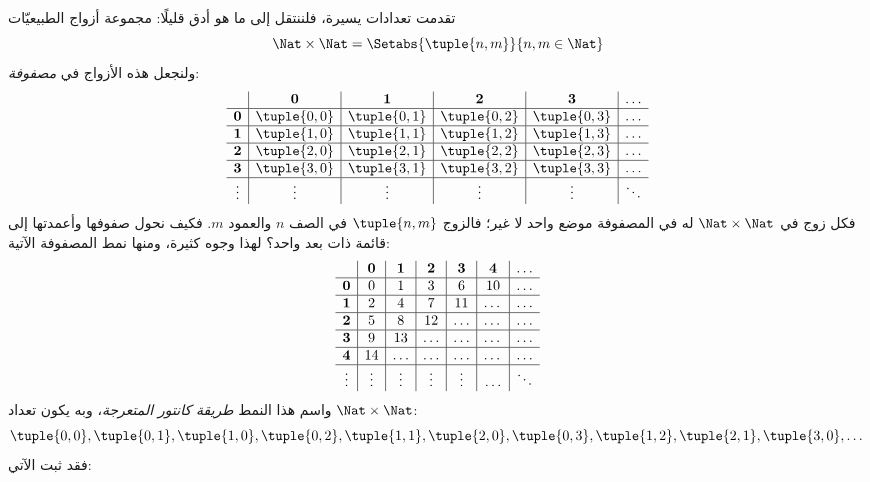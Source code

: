 \documentclass[../../../include/open-logic-section]{subfiles}
\begin{document}


\begin{explain}
تقدمت تعدادات يسيرة، فلننتقل إلى ما هو أدق قليلًا: مجموعة أزواج
الطبيعيّات
\[
\Nat \times \Nat = \Setabs{\tuple{n,m}}{n,m \in \Nat}
\]
ولنجعل هذه الأزواج في \emph{مصفوفة}:
\[
\begin{array}{ c | c | c | c | c | c}
& \mathbf 0 & \mathbf 1 & \mathbf 2 & \mathbf 3 & \dots \\
\hline
\mathbf 0 & \tuple{0,0} & \tuple{0,1} & \tuple{0,2} & \tuple{0,3} & \dots \\
\hline
\mathbf 1 & \tuple{1,0} & \tuple{1,1} & \tuple{1,2} & \tuple{1,3} & \dots \\
\hline
\mathbf 2 & \tuple{2,0} & \tuple{2,1} & \tuple{2,2} & \tuple{2,3} & \dots \\
\hline
\mathbf 3 & \tuple{3,0} & \tuple{3,1} & \tuple{3,2} & \tuple{3,3} & \dots \\
\hline
\vdots & \vdots & \vdots & \vdots & \vdots & \ddots\\
\end{array}
\]
فكل زوج في $\Nat \times \Nat$ له في المصفوفة موضع واحد لا غير؛
فالزوج $\tuple{n,m}$ في الصف $n$ والعمود $m$. فكيف نحول صفوفها
وأعمدتها إلى قائمة ذات بعد واحد؟ لهذا وجوه كثيرة، ومنها نمط المصفوفة الآتية:
\[
\begin{array}{ c | c | c | c | c | c | c}
& \mathbf 0 & \mathbf 1 & \mathbf 2 & \mathbf 3 & \mathbf 4 &\dots \\
\hline
\mathbf 0 & 0  & 1& 3 & 6& 10 &\ldots \\
\hline
\mathbf 1 &2 & 4& 7 & 11 & \dots &\ldots \\
\hline
\mathbf 2 & 5 & 8 & 12 & \ldots & \dots&\ldots \\
\hline
\mathbf 3 & 9 & 13 & \ldots & \ldots & \dots & \ldots \\
\hline
\mathbf 4 & 14 & \ldots & \ldots & \ldots & \dots & \ldots \\
\hline
\vdots & \vdots & \vdots & \vdots & \vdots&\ldots & \ddots\\
\end{array}
\]\noindent
واسم هذا النمط \emph{طريقة كانتور المتعرجة}، وبه يكون تعداد
$\Nat \times \Nat$:
\[
\tuple{0,0}, \tuple{0,1}, \tuple{1,0}, \tuple{0,2}, \tuple{1,1},
\tuple{2,0}, \tuple{0,3}, \tuple{1,2}, \tuple{2,1}, \tuple{3,0}, \dots
\]
فقد ثبت الآتي:
\end{explain}
\end{document}
